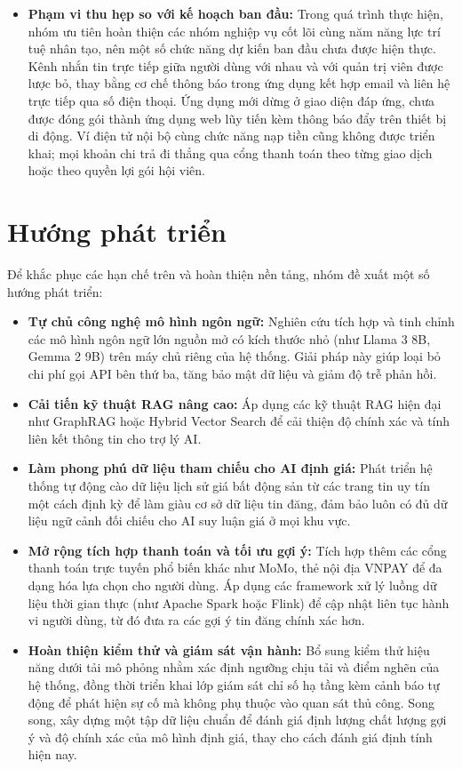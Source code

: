 \begin{itemize}
    \item \textbf{Phạm vi thu hẹp so với kế hoạch ban đầu:} Trong quá trình thực hiện, nhóm ưu tiên hoàn thiện các nhóm nghiệp vụ cốt lõi cùng năm năng lực trí tuệ nhân tạo, nên một số chức năng dự kiến ban đầu chưa được hiện thực. Kênh nhắn tin trực tiếp giữa người dùng với nhau và với quản trị viên được lược bỏ, thay bằng cơ chế thông báo trong ứng dụng kết hợp email và liên hệ trực tiếp qua số điện thoại. Ứng dụng mới dừng ở giao diện đáp ứng, chưa được đóng gói thành ứng dụng web lũy tiến kèm thông báo đẩy trên thiết bị di động. Ví điện tử nội bộ cùng chức năng nạp tiền cũng không được triển khai; mọi khoản chi trả đi thẳng qua cổng thanh toán theo từng giao dịch hoặc theo quyền lợi gói hội viên.
\end{itemize}

\section{Hướng phát triển}

Để khắc phục các hạn chế trên và hoàn thiện nền tảng, nhóm đề xuất một số hướng phát triển:
\begin{itemize}
    \item \textbf{Tự chủ công nghệ mô hình ngôn ngữ:} Nghiên cứu tích hợp và tinh chỉnh các mô hình ngôn ngữ lớn nguồn mở có kích thước nhỏ (như Llama 3 8B, Gemma 2 9B) trên máy chủ riêng của hệ thống. Giải pháp này giúp loại bỏ chi phí gọi API bên thứ ba, tăng bảo mật dữ liệu và giảm độ trễ phản hồi.
    \item \textbf{Cải tiến kỹ thuật RAG nâng cao:} Áp dụng các kỹ thuật RAG hiện đại như GraphRAG hoặc Hybrid Vector Search để cải thiện độ chính xác và tính liên kết thông tin cho trợ lý AI.
    \item \textbf{Làm phong phú dữ liệu tham chiếu cho AI định giá:} Phát triển hệ thống tự động cào dữ liệu lịch sử giá bất động sản từ các trang tin uy tín một cách định kỳ để làm giàu cơ sở dữ liệu tin đăng, đảm bảo luôn có đủ dữ liệu ngữ cảnh đối chiếu cho AI suy luận giá ở mọi khu vực.
    \item \textbf{Mở rộng tích hợp thanh toán và tối ưu gợi ý:} Tích hợp thêm các cổng thanh toán trực tuyến phổ biến khác như MoMo, thẻ nội địa VNPAY để đa dạng hóa lựa chọn cho người dùng. Áp dụng các framework xử lý luồng dữ liệu thời gian thực (như Apache Spark hoặc Flink) để cập nhật liên tục hành vi người dùng, từ đó đưa ra các gợi ý tin đăng chính xác hơn.
    \item \textbf{Hoàn thiện kiểm thử và giám sát vận hành:} Bổ sung kiểm thử hiệu năng dưới tải mô phỏng nhằm xác định ngưỡng chịu tải và điểm nghẽn của hệ thống, đồng thời triển khai lớp giám sát chỉ số hạ tầng kèm cảnh báo tự động để phát hiện sự cố mà không phụ thuộc vào quan sát thủ công. Song song, xây dựng một tập dữ liệu chuẩn để đánh giá định lượng chất lượng gợi ý và độ chính xác của mô hình định giá, thay cho cách đánh giá định tính hiện nay.
\end{itemize}


